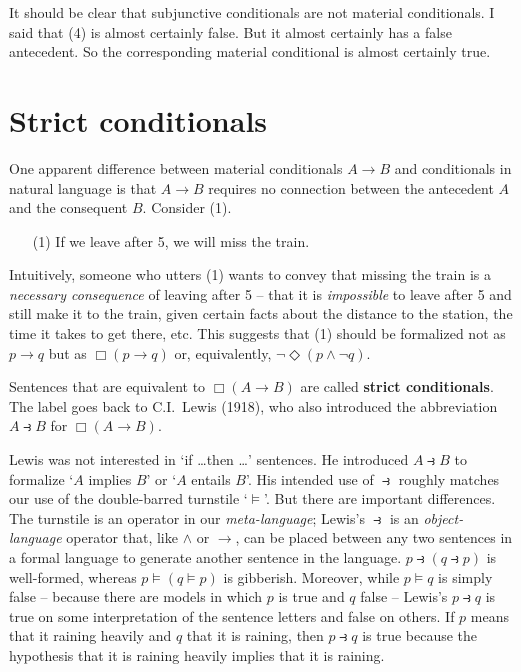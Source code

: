 It should be clear that subjunctive conditionals are not material conditionals.
I said that (4) is almost certainly false. But it almost certainly has a false
antecedent. So the corresponding material conditional is almost certainly true.

\section{Strict conditionals}\label{sec:strict-implication}


One apparent difference between material conditionals $A \to B$ and conditionals
in natural language is that $A\to B$ requires no connection between the
antecedent $A$ and the consequent $B$. Consider (1).
\begin{enumerate}[leftmargin=10mm]
  \item[(1)] If we leave after 5, we will miss the train.
\end{enumerate}
Intuitively, someone who utters (1) wants to convey that missing the train
is a \emph{necessary consequence} of leaving after 5 -- that it is \emph{impossible} to
leave after 5 and still make it to the train, given certain facts about the
distance to the station, the time it takes to get there, etc. This suggests that
(1) should be formalized not as $p \to q$ but as $\Box(p \to q)$ or,
equivalently, $\neg \Diamond(p \land \neg q)$.

Sentences that are equivalent to $\Box(A \to B)$ are called \textbf{strict
  conditionals}. The label goes back to C.I.\ Lewis (1918), who also introduced
the abbreviation $A \strictif B$ for $\Box(A \to B)$.

Lewis was not interested in `if \ldots then \ldots' sentences. He introduced
$A \strictif B$ to formalize `$A$ implies $B$' or `$A$ entails $B$'. His
intended use of $\strictif$ roughly matches our use of the double-barred
turnstile `$\models$'. But there are important differences. The turnstile is an
operator in our \emph{meta-language}; Lewis's $\strictif$ is an
\emph{object-language} operator that, like $\land$ or $\to$, can be placed
between any two sentences in a formal language to generate another sentence in
the language. $p \strictif (q \strictif p)$ is well-formed, whereas
$p \models (q\models p)$ is gibberish. Moreover, while $p \models q$ is simply
false -- because there are models in which $p$ is true and $q$ false -- Lewis's
$p \strictif q$ is true on some interpretation of the sentence letters and false
on others. If $p$ means that it raining heavily and $q$ that it is raining, then
$p \strictif q$ is true because the hypothesis that it is raining heavily
implies that it is raining.

